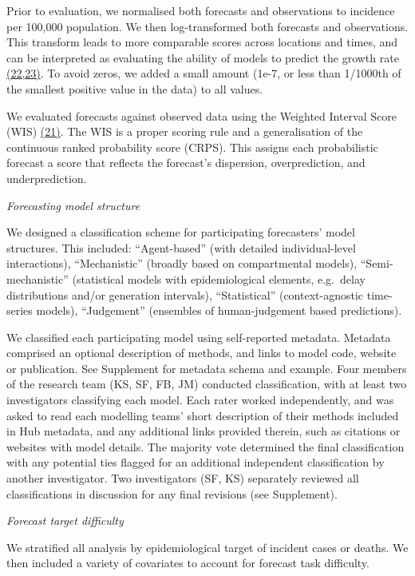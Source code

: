 \documentclass[
  letterpaper,
  DIV=11,
  numbers=noendperiod]{scrartcl}
\begin{document}
Prior to evaluation, we normalised both forecasts and observations to
incidence per 100,000 population. We then log-transformed both forecasts
and observations. This transform leads to more comparable scores across
locations and times, and can be interpreted as evaluating the ability of
models to predict the growth rate
\href{https://www.zotero.org/google-docs/?NuBRI2}{(22,23)}. To avoid
zeros, we added a small amount (1e-7, or less than 1/1000th of the
smallest positive value in the data) to all values.

We evaluated forecasts against observed data using the Weighted Interval
Score (WIS) \href{https://www.zotero.org/google-docs/?T3es1k}{(21)}. The
WIS is a proper scoring rule and a generalisation of the continuous
ranked probability score (CRPS). This assigns each probabilistic
forecast a score that reflects the forecast's dispersion,
overprediction, and underprediction.

\emph{Forecasting model structure}

We designed a classification scheme for participating forecasters' model
structures. This included: ``Agent-based'' (with detailed
individual-level interactions), ``Mechanistic'' (broadly based on
compartmental models), ``Semi-mechanistic'' (statistical models with
epidemiological elements, e.g.~delay distributions and/or generation
intervals), ``Statistical'' (context-agnostic time-series models),
``Judgement'' (ensembles of human-judgement based predictions).

We classified each participating model using self-reported metadata.
Metadata comprised an optional description of methods, and links to
model code, website or publication. See Supplement for metadata schema
and example. Four members of the research team (KS, SF, FB, JM)
conducted classification, with at least two investigators classifying
each model. Each rater worked independently, and was asked to read each
modelling teams' short description of their methods included in Hub
metadata, and any additional links provided therein, such as citations
or websites with model details. The majority vote determined the final
classification with any potential ties flagged for an additional
independent classification by another investigator. Two investigators
(SF, KS) separately reviewed all classifications in discussion for any
final revisions (see Supplement).

\emph{Forecast target difficulty}

We stratified all analysis by epidemiological target of incident cases
or deaths. We then included a variety of covariates to account for
forecast task difficulty.
\end{document}
